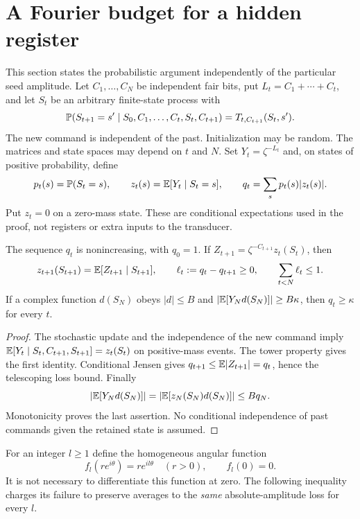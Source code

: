 \section{A Fourier budget for a hidden register}\label{sec:fourier34}
This section states the probabilistic argument independently of the
particular seed amplitude. Let $C_1,\ldots,C_N$ be independent fair bits,
put $L_t=C_1+\cdots+C_t$, and let $S_t$ be an arbitrary finite-state
process with
\begin{equation}\label{eq:markov34}
 \mathbb P(S_{t+1}=s'\mid S_0,C_1,\ldots,C_t,S_t,C_{t+1})
                 =T_{t,C_{t+1}}(S_t,s').
\end{equation}
The new command is independent of the past. Initialization may be random.
The matrices and state spaces may depend on $t$ and $N$.
Set $Y_t=\zeta^{-L_t}$ and, on states of positive probability, define
\begin{equation}\label{eq:posterior34}
 p_t(s)=\mathbb P(S_t=s),\qquad z_t(s)=\mathbb E[Y_t\mid S_t=s],\qquad
 q_t=\sum_s p_t(s)|z_t(s)|.
\end{equation}
Put $z_t=0$ on a zero-mass state. These are conditional expectations used
in the proof, not registers or extra inputs to the transducer.

\begin{lemma}\label{lem:phase34}
The sequence $q_t$ is nonincreasing, with $q_0=1$. If
$Z_{t+1}=\zeta^{-C_{t+1}}z_t(S_t)$, then
\begin{equation}\label{eq:bary-phase34}
 z_{t+1}(S_{t+1})=\mathbb E[Z_{t+1}\mid S_{t+1}],\qquad
 \ell_t:=q_t-q_{t+1}\ge0,\qquad \sum_{t<N}\ell_t\le1.
\end{equation}
If a complex function $d(S_N)$ obeys $|d|\le B$ and
$|\mathbb E[Y_Nd(S_N)]|\ge B\kappa$, then $q_t\ge\kappa$ for every $t$.
\end{lemma}
\begin{proof}
The stochastic update and the independence of the new command imply
$\mathbb E[Y_t\mid S_t,C_{t+1},S_{t+1}]=z_t(S_t)$ on positive-mass events.
The tower property gives the first identity. Conditional Jensen gives
$q_{t+1}\le\mathbb E|Z_{t+1}|=q_t$, hence the telescoping loss bound.
Finally
\[
 |\mathbb E[Y_Nd(S_N)]|=|\mathbb E[z_N(S_N)d(S_N)]|\le Bq_N.
\]
Monotonicity proves the last assertion. No conditional independence of
past commands given the retained state is assumed.
\end{proof}

For an integer $l\ge1$ define the homogeneous angular function
\begin{equation}\label{eq:angular34}
 f_l(re^{i\theta})=r e^{il\theta}\quad(r>0),\qquad f_l(0)=0.
\end{equation}
It is not necessary to differentiate this function at zero. The following
inequality charges its failure to preserve averages to the \emph{same}
absolute-amplitude loss for every $l$.

